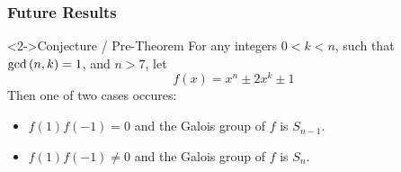 \documentclass{beamer}
\newcommand{\Q}{\mathbb{Q}}
\newcommand{\Z}{\mathbb{Z}}
\newcommand{\Hom}{{\rm Hom}}
\begin{document}
\begin{frame}[fragile]
{\begin{block}{}
        \end{block}
    }
\end{frame}

\begin{frame}
    \frametitle{Future Results}
    \begin{alertblock}<2->{Conjecture / Pre-Theorem}
        For any integers $0 < k < n$, such that ${\rm gcd}\left( n,k \right) = 1$, and $n > 7$, let 
        \[
            f\left( x \right) = x^n \pm 2x^k \pm 1
        \] 
        Then one of two cases occures:
        \begin{itemize}
            \item $f\left( 1 \right)f\left( -1 \right) = 0$ and the Galois group of $f$ is $S_{n-1}$.
            \item $f\left( 1 \right)f\left( -1 \right) \neq 0$ and the Galois group of $f$ is $S_n$.
        \end{itemize}
    \end{alertblock}
\end{frame}
\end{document}
